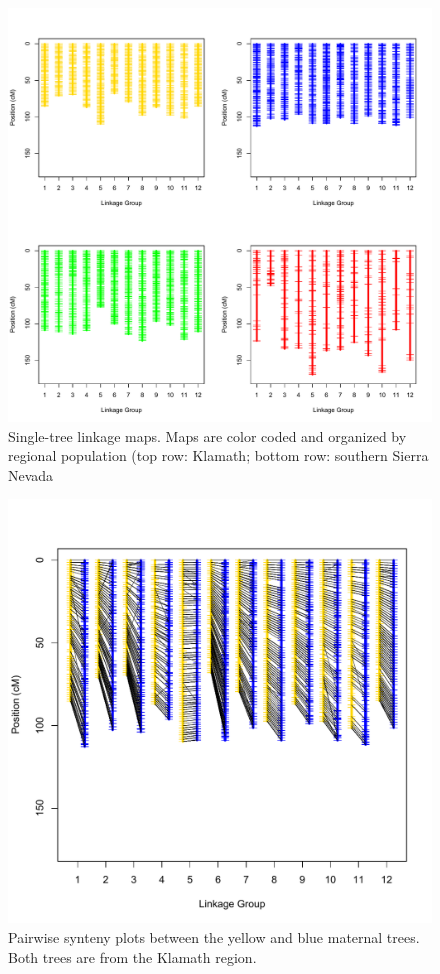 \documentclass[smallextended]{svjour3}
\begin{document}
\begin{figure}[ht]
  \centering
  \includegraphics[width=\textwidth]{indiv_maps}
  \caption{Single-tree linkage maps. Maps are color coded and organized by
    regional population (top row: Klamath; bottom row: southern Sierra Nevada}
  \label{f:con}
\end{figure}

\begin{figure}[ht]
  \centering
  \includegraphics[width=\textwidth]{yellow_blue_synteny}
  \caption{Pairwise synteny plots between the yellow and blue maternal
    trees. Both trees are from the Klamath region.}
  \label{f:con}
\end{figure}
\end{document}
